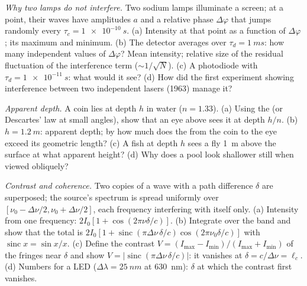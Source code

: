 \begin{exercise}[$\star\star$]\label{exo:b2:scalar-light-model:8}
\emph{Why two lamps do not interfere.} Two sodium lamps illuminate a
screen; at a point, their waves have amplitudes $a$ and a relative
phase $\Delta\varphi$ that jumps randomly every $\tau_c = \qty{1e-10}{s}$. (a)
Intensity at that point as a function of $\Delta\varphi$; its maximum and
minimum. (b) The detector averages over $\tau_d = \qty{1}{ms}$: how many
independent values of $\Delta\varphi$? Mean intensity; relative size of the
residual fluctuation of the interference term ($\sim 1/\sqrt N$). (c) A
photodiode with $\tau_d = \qty{1e-11}{s}$: what would it see? (d) How did
the first experiment showing interference between two independent
lasers (1963) manage it?
\end{exercise}

\begin{exercise}[$\star\star$]\label{exo:b2:scalar-light-model:9}
\emph{Apparent depth.} A coin lies at depth $h$ in water ($n = 1.33$).
(a) Using the  (or Descartes' law at small angles), show
that an eye above sees it at depth $h/n$. (b) $h = \qty{1.2}{m}$: apparent
depth; by how much does the  from the coin to the eye
exceed its geometric length? (c) A fish at depth $h$ sees a fly \qty{1}{m}
above the surface at what apparent height? (d) Why does a pool look
shallower still when viewed obliquely?
\end{exercise}

\begin{exercise}[$\star\star\star$]\label{exo:b2:scalar-light-model:10}
\emph{Contrast and coherence.} Two copies of a wave with a path
difference $\delta$ are superposed; the source's spectrum is spread
uniformly over $[\nu_0 - \Delta\nu/2, \nu_0 + \Delta\nu/2]$, each frequency
interfering with itself only. (a) Intensity from one frequency: $2I_0
[1 + \cos(2\pi\nu\delta/c)]$. (b) Integrate over the band and show that the
total is $2I_0[1 + \operatorname{sinc}(\pi\Delta\nu\,\delta/c)\cos(2\pi\nu_0\delta/c)]$ with
$\operatorname{sinc}x = \sin x/x$. (c) Define the contrast $V = (I_{\max} -
I_{\min})/(I_{\max} + I_{\min})$ of the fringes near $\delta$ and show $V =
|\operatorname{sinc}(\pi\Delta\nu\,\delta/c)|$: it vanishes at $\delta = c/\Delta\nu = \ell_c$. (d)
Numbers for a LED ($\Delta\lambda = \qty{25}{nm}$ at \qty{630}{nm}): $\delta$ at which the
contrast first vanishes.
\end{exercise}

